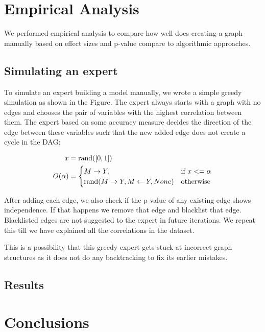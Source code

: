 \documentclass{article}
\begin{document}
\section{Empirical Analysis}
We performed empirical analysis to compare how well does creating a graph manually based on effect sizes and p-value compare to algorithmic approaches.
\subsection{Simulating an expert}
To simulate an expert building a model manually, we wrote a simple greedy simulation as shown in the Figure. The expert always starts with a graph with
no edges and chooses the pair of variables with the highest correlation between them. The expert based on some accuracy measure decides the direction
of the edge between these variables such that the new added edge does not create a cycle in the DAG:

\begin{equation}
	\begin{split}
		x &= \textnormal{rand}([0, 1]) \\
		O(\alpha) &= \begin{cases} 
			M \rightarrow Y, & \textnormal{if  } x <= \alpha \\
			\textnormal{rand}(M \rightarrow Y, M \leftarrow Y, None) & \textnormal{otherwise} \\
			     \end{cases} \\
	\end{split}
\end{equation}

After adding each edge, we also check if the p-value of any existing edge shows independence. If that happens we remove that edge and blacklist that edge. 
Blacklisted edges are not suggested to the expert in future iterations. We repeat this till we have explained all the correlations in the dataset.

This is a possibility that this greedy expert gets stuck at incorrect graph structures as it does not do any backtracking to fix its earlier mistakes.


\subsection{Results}

\section{Conclusions}
\end{document}

